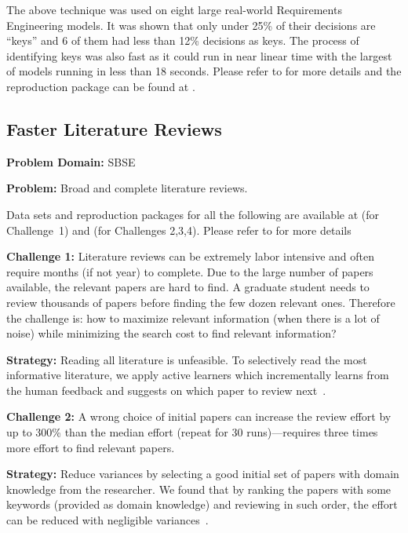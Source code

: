 \documentclass[sigconf,anonymous,review]{acmart}
\begin{document}
The above technique was used on eight large real-world Requirements Engineering models. It was shown that only under 25\% of their decisions are ``keys'' and 6 of them had less than 12\% decisions as keys. The process of identifying keys was also fast as it could run in near linear time with the largest of models running in less than 18 seconds. Please refer to \cite{mathew2017shorter} for more details and the reproduction package can be found at .

\subsection{Faster Literature Reviews}
\noindent\textbf{Problem Domain: } SBSE

\noindent\textbf{Problem: }
 Broad and complete literature reviews.
 
 Data sets and reproduction packages for all the following are available at  (for Challenge~1) and 
 (for Challenges 2,3,4). Please refer to \cite{yu2016finding, YuM17} for more details
   
\vspace{1.0ex}
\noindent\textbf{Challenge 1: }
Literature reviews can be extremely labor intensive and often require months (if not year) to complete. Due to the large number of papers available, the relevant papers are hard to find. A graduate student needs to review thousands of papers before finding the few dozen relevant ones.
Therefore the challenge is: how to maximize relevant information (when there is a lot of noise) while minimizing the search cost to find relevant information?

\noindent\textbf{Strategy: }
  Reading all   literature  is unfeasible. To selectively read the most informative literature, we apply active learners which incrementally learns from the human feedback and suggests on which paper to review next~\cite{YuM17a}.
   
\vspace{1.0ex}
\noindent\textbf{Challenge 2: }
A wrong choice of initial papers can increase the review effort by up to 300\% than the median effort (repeat for 30 runs)---requires three times more effort to find   relevant papers. 

\noindent\textbf{Strategy: }
Reduce  variances  by selecting a good initial set of papers with domain knowledge from the researcher. We found that by ranking the papers with some  keywords (provided as domain knowledge) and reviewing in such order, the effort can be   reduced with negligible variances~\cite{YuM17}.
   
\end{document}
